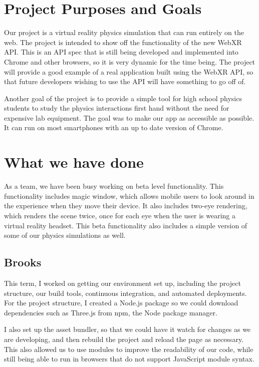 \documentclass[onecolumn, draftclsnofoot,10pt, compsoc]{IEEEtran}
\begin{document}
\clearpage

\section{Project Purposes and Goals}
Our project is a virtual reality physics simulation that can run entirely on the web. The project is intended to show off the functionality of the new WebXR API. This is an API spec that is still being developed and implemented into Chrome and other browsers, so it is very dynamic for the time being. The project will provide a good example of a real application built using the WebXR API, so that future developers wishing to use the API will have something to go off of. 

Another goal of the project is to provide a simple tool for high school physics students to study the physics interactions first hand without the need for expensive lab equipment. The goal was to make our app as accessible as possible. It can run on most smartphones with an up to date version of Chrome.

\section{What we have done}
As a team, we have been busy working on beta level functionality. This functionality includes magic window, which allows mobile users to look around in the experience when they move their device. It also includes two-eye rendering, which renders the scene twice, once for each eye when the user is wearing a virtual reality headset. This beta functionality also includes a simple version of some of our physics simulations as well.  

\subsection{Brooks}
This term, I worked on getting our environment set up, including the project structure, our build tools, continuous integration, and automated deployments. For the project structure, I created a Node.js package so we could download dependencies such as Three.js from npm, the Node package manager. 

I also set up the asset bundler, so that we could have it watch for changes as we are developing, and then rebuild the project and reload the page as necessary. This also allowed us to use modules to improve the readability of our code, while still being able to run in browsers that do not support JavaScript module syntax. 
\end{document}
